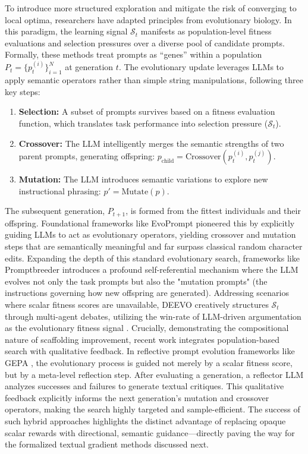 To introduce more structured exploration and mitigate the risk of converging to local optima, researchers have adapted principles from evolutionary biology. In this paradigm, the learning signal $\mathcal{S}_t$ manifests as population-level fitness evaluations and selection pressures over a diverse pool of candidate prompts. Formally, these methods treat prompts as ``genes'' within a population $P_t = \{p_t^{(i)}\}_{i=1}^{N}$ at generation $t$. The evolutionary update leverages LLMs to apply semantic operators rather than simple string manipulations, following three key steps:
\begin{enumerate}
\item \textbf{Selection:} A subset of prompts survives based on a fitness evaluation function, which translates task performance into selection pressure ($\mathcal{S}_t$).
\item \textbf{Crossover:} The LLM intelligently merges the semantic strengths of two parent prompts, generating offspring: $p_{\text{child}} = \text{Crossover}(p_t^{(i)}, p_t^{(j)})$.
\item \textbf{Mutation:} The LLM introduces semantic variations to explore new instructional phrasing: $p' = \text{Mutate}(p)$.
\end{enumerate}
The subsequent generation, $P_{t+1}$, is formed from the fittest individuals and their offspring. Foundational frameworks like EvoPrompt \citep{guo2025evopromptconnectingllmsevolutionary} pioneered this by explicitly guiding LLMs to act as evolutionary operators, yielding crossover and mutation steps that are semantically meaningful and far surpass classical random character edits. Expanding the depth of this standard evolutionary search, frameworks like Promptbreeder \citep{fernando2024promptbreeder} introduces a profound self-referential mechanism where the LLM evolves not only the task prompts but also the "mutation prompts" (the instructions governing how new offspring are generated). Addressing scenarios where scalar fitness scores are unavailable, DEEVO creatively structures $\mathcal{S}_t$ through multi-agent debates, utilizing the win-rate of LLM-driven argumentation as the evolutionary fitness signal \citep{nair2025tournamentpromptsevolvingllm}. Crucially, demonstrating the compositional nature of scaffolding improvement, recent work integrates population-based search with qualitative feedback. In reflective prompt evolution frameworks like GEPA \citep{agrawal2025gepareflectivepromptevolution}, the evolutionary process is guided not merely by a scalar fitness score, but by a meta-level reflection step. After evaluating a generation, a reflector LLM analyzes successes and failures to generate textual critiques. This qualitative feedback explicitly informs the next generation's mutation and crossover operators, making the search highly targeted and sample-efficient. The success of such hybrid approaches highlights the distinct advantage of replacing opaque scalar rewards with directional, semantic guidance—directly paving the way for the formalized textual gradient methods discussed next.


